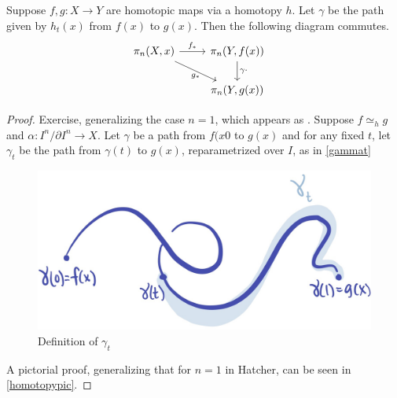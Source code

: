 \documentclass{article}[11pt]
\begin{document}
\begin{lemma}\label{basepthomotopy}
Suppose $f,g\colon X\to Y$ are homotopic maps via a homotopy $h$. Let $\gamma$ be the path given by $h_t(x)$ from $f(x)$ to $g(x)$. Then the following diagram commutes.
\[
	\begin{tikzcd}
	\pi_n(X,x)\rar["f_\ast" above]\ar[dr, "g_\ast" below] & \pi_n(Y, f(x))\dar["\gamma\cdot" right] \\
	 & \pi_n(Y, g(x))
	\end{tikzcd}\quad
\]

\end{lemma}

\begin{proof}
Exercise, generalizing the case $n=1$, which appears as \cite[Proposition 1.18]{hatcher}. Suppose $f\simeq_h g$ and $\alpha\colon I^n/\partial I^n \to X$. Let  $\gamma$ be a path from $f(x0$ to $g(x)$ and for any fixed $t$, let $\gamma_t$ be the path from $\gamma(t)$ to $g(x)$, reparametrized over $I$, as in \autoref{gammat}

\begin{figure}[h]
  \includegraphics[scale=.7]{pics/gammat.png}
  \centering
  \caption{Definition of $\gamma_t$}
  \label{gammat}
\end{figure}

A pictorial proof, generalizing that for $n=1$ in Hatcher, can be seen in \autoref{homotopypic}.


\end{proof}
\end{document}
